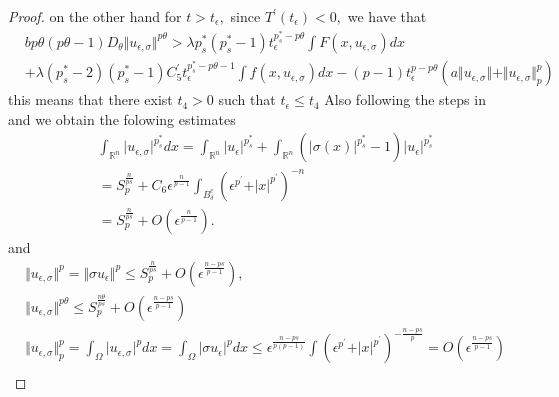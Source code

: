 \documentclass[10pt,twoside,reqno,centertags,draft]{amsart}
\begin{document}
\begin{proof}
on the other hand  for $ t >t_{\epsilon},$ since $ T^{\prime}(t_{\epsilon}) <0,$ we have that
\begin{equation*}
\begin{aligned}
& b p\theta (p\theta -1) D_{\theta} \Vert u_{\epsilon,\sigma}\Vert^{p\theta} >\lambda p_s^* (p_s^* -1)t_{\epsilon}^{p_s^* -p\theta}\int F(x,u_{\epsilon,\sigma})dx\\
& +\lambda (p_s^* -2)(p_s^* -1)C_{5}^{\prime} t_{\epsilon}^{p_s^* -p\theta -1}\int f(x, u_{\epsilon,\sigma}) dx -(p -1)t_{\epsilon}^{p -p\theta}\left( a\Vert u_{\epsilon,\sigma}\Vert +\Vert u_{\epsilon,\sigma}\Vert^{p}_{p}\right)
\end{aligned}
\end{equation*}
this means that there exist $ t_4 > 0$ such that $ t_{\epsilon} \leq t_4$\newline
Also following the steps in \cite{servadei2015brezis} and \cite{mosconi2016brezis} we obtain the folowing estimates
\begin{equation}\label{es01}
\begin{aligned}
&\int_{\mathbb{R}^n} \vert u_{\epsilon,\sigma}\vert^{p_s^*}dx =\int_{\mathbb{R}^n} \vert u_{\epsilon}\vert^{p_s^*} +\int_{\mathbb{R}^n} \left( 
\vert \sigma(x)\vert^{p_s^*} -1 \right)\vert u_{\epsilon}\vert^{p_s^*}\\
& = S_{p}^{\frac{n}{ps}} +C_6\epsilon^{ \frac{n}{p -1}}\int_{B_{\delta}^{c}} \left( \epsilon^{p^{\prime}} +\vert x\vert^{p^{\prime}}\right)^{-n}\\
& =S_{p}^{\frac{n}{ps}} +O(\epsilon^{\frac{n}{p -1}}).
\end{aligned}
\end{equation}
and
\begin{equation}\label{es03}
\begin{aligned}
&\Vert u_{\epsilon,\sigma}\Vert^{p}=\Vert \sigma u_{\epsilon}\Vert^{p} \leq S_{p}^{\frac{n}{ps}} +O(\epsilon^{\frac{n -ps}{p -1}}),\\
& \Vert u_{\epsilon,\sigma}\Vert^{p\theta} \leq S_{p}^{\frac{n\theta}{ps}} +O(\epsilon^{\frac{n -ps}{p -1}})\\
&  \Vert u_{\epsilon,\sigma}\Vert^{p}_{p} = \int_{\Omega}\vert u_{\epsilon,\sigma}\vert^{p}dx = \int_{\Omega}\vert \sigma u_{\epsilon}\vert^{p}dx \leq \epsilon^{\frac{n -ps}{p(p -1)}}\int \left( \epsilon^{p^{\prime}} +\vert x\vert^{p^{\prime}}\right)^{-\frac{n -ps}{p}} =O(\epsilon^{\frac{n -ps}{p -1}})\\
\end{aligned}
\end{equation}

\end{proof}
\end{document}

